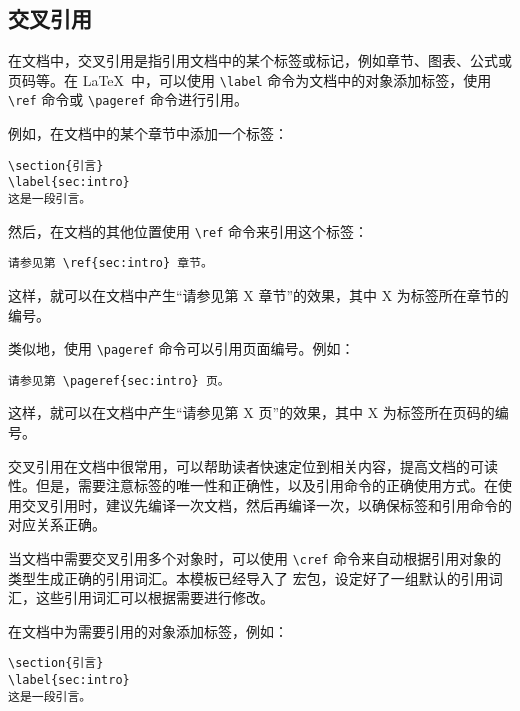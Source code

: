 \subsection{交叉引用}

在文档中，交叉引用是指引用文档中的某个标签或标记，例如章节、图表、公式或页码等。在 \LaTeX\ 中，可以使用 \verb|\label| 命令为文档中的对象添加标签，使用 \verb|\ref| 命令或 \verb|\pageref| 命令进行引用。

例如，在文档中的某个章节中添加一个标签：

\begin{Verbatim}
\section{引言}
\label{sec:intro}
这是一段引言。
\end{Verbatim}

然后，在文档的其他位置使用 \verb|\ref| 命令来引用这个标签：

\begin{Verbatim}
请参见第 \ref{sec:intro} 章节。
\end{Verbatim}

这样，就可以在文档中产生“请参见第 X 章节”的效果，其中 X 为标签所在章节的编号。

类似地，使用 \verb|\pageref| 命令可以引用页面编号。例如：

\begin{Verbatim}
请参见第 \pageref{sec:intro} 页。
\end{Verbatim}

这样，就可以在文档中产生“请参见第 X 页”的效果，其中 X 为标签所在页码的编号。

交叉引用在文档中很常用，可以帮助读者快速定位到相关内容，提高文档的可读性。但是，需要注意标签的唯一性和正确性，以及引用命令的正确使用方式。在使用交叉引用时，建议先编译一次文档，然后再编译一次，以确保标签和引用命令的对应关系正确。

当文档中需要交叉引用多个对象时，可以使用 \verb|\cref| 命令来自动根据引用对象的类型生成正确的引用词汇。本模板已经导入了  宏包，设定好了一组默认的引用词汇，这些引用词汇可以根据需要进行修改。

在文档中为需要引用的对象添加标签，例如：

\begin{Verbatim}
\section{引言}
\label{sec:intro}
这是一段引言。
\end{Verbatim}

